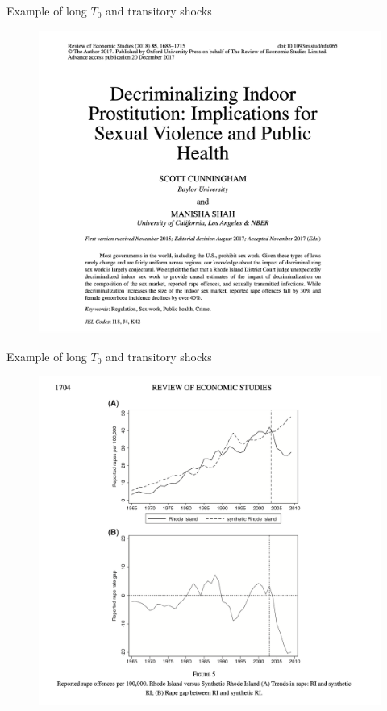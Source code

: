 \documentclass{beamer}
\begin{document}
\begin{frame}{Example of long $T_0$ and transitory shocks}

	\begin{figure}
	\includegraphics[scale=0.25]{./lecture_includes/restud_titlepage}
	\end{figure}

\end{frame}

\begin{frame}{Example of long $T_0$ and transitory shocks}

	\begin{figure}
	\includegraphics[scale=0.20]{./lecture_includes/restud_rapesynth}
	\end{figure}

\end{frame}
\end{document}
